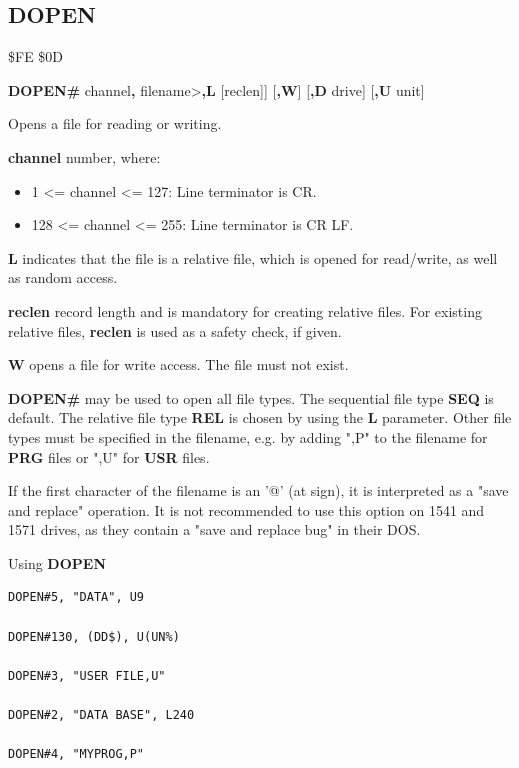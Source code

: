 \subsection{DOPEN}
\begin{description}[leftmargin=2cm,style=nextline]
\item [Token:]    \$FE \$0D
\item [Format:]   {\bf DOPEN\#} channel{\bf,} filename>{\bf,L} [reclen]] [{\bf,W}] [{\bf,D} drive] [{\bf,U} unit]
\item [Usage:]    Opens a file for reading or writing.

                  {\bf channel} number, where:
                  \begin{itemize}
                     \item 1 <= channel <= 127: Line terminator is CR.
                     \item 128 <= channel <= 255: Line terminator is CR LF.
                  \end{itemize}

                  {\bf L} indicates that the file is a relative file, which is opened for read/write, as well as random access.

                  {\bf reclen} record length and is mandatory for creating relative files. For existing relative files, {\bf reclen} is used as a safety check, if given.

                  {\bf W} opens a file for write access. The file must not exist.

                  \filenamedefinition

                  \drivedefinition

                  \unitdefinition

\item [Remarks:]  {\bf DOPEN\#} may be used to open all file types. The sequential file type {\bf SEQ} is default. The relative file type {\bf REL} is chosen by using the {\bf L} parameter. Other file types must be specified in the filename, e.g. by adding ",P" to the filename for {\bf PRG} files or ",U" for {\bf USR} files.

                  If the first character of the filename is an '@' (at sign), it is interpreted as a "save and replace" operation. It is not recommended to use this option on 1541 and 1571 drives, as they contain a "save and replace bug" in their DOS.

\item [Examples:] Using {\bf DOPEN}

\begin{tcolorbox}[colback=black,coltext=white]
\verbatimfont{\codefont}
\begin{verbatim}
DOPEN#5, "DATA", U9

DOPEN#130, (DD$), U(UN%)

DOPEN#3, "USER FILE,U"

DOPEN#2, "DATA BASE", L240

DOPEN#4, "MYPROG,P"
\end{verbatim}
\end{tcolorbox}
\end{description}

